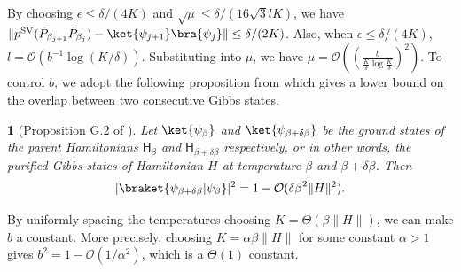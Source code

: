 \documentclass{article}
\theoremstyle{plain}
\newtheorem{lem}{\protect\lemmaname}
\theoremstyle{plain}
\theoremstyle{plain}
\theoremstyle{plain}
\theoremstyle{plain}
\theoremstyle{plain}
\theoremstyle{plain}
\providecommand{\lemmaname}{Lemma}
\newcommand{\norm}[1]{\lVert #1 \rVert}
\newcommand{\sfH}{\ensuremath{\mathsf{H}}}
\newcommand{\calO}{\ensuremath{\mathcal{O}}}
\begin{document}
By choosing $\epsilon \le \delta/(4K)$ and $\sqrt{\mu} \le \delta/(16\sqrt{3} l K)$, we have $\|p^{\text{SV}}(\tilde{P}_{\beta_{j+1}}\tilde{P}_{\beta_j}) - \ket{\psi_{j+1}} \bra{\psi_j}\| \le \delta/(2K)$. Also, when $\epsilon \le \delta/(4K)$, $l = \calO(b^{-1} \log(K/\delta))$. Substituting into $\mu$, we have $\mu = \calO\left( \left( \frac{b}{\frac{K}{\delta} \log \frac{K }{\delta}} \right)^2 \right)$.
To control $b$, we adopt the following proposition from \cite{chen2023quantumthermalstatepreparation} which gives a lower bound on the overlap between two consecutive Gibbs states.
\begin{lem}[Proposition G.2 of \cite{chen2023quantumthermalstatepreparation}]
    \label{lem:overlap}
    Let $\ket{\psi_{\beta}}$ and $\ket{\psi_{\beta+\delta\beta}}$ be the ground states of the parent Hamiltonians $\sfH_\beta$ and $\sfH_{\beta+\delta\beta}$ respectively, or in other words, the purified Gibbs states of Hamiltonian $H$ at temperature $\beta$ and $\beta + \delta\beta$. Then
    \begin{equation}
        |\braket{\psi_{\beta+\delta\beta} | \psi_{\beta}}|^2 = 1 - \calO( {\delta\beta}^2 \norm{H}^2  ).
    \end{equation}
\end{lem}
By uniformly spacing the temperatures choosing $K = \Theta(\beta \norm{H})$, we can make $b$ a constant. More precisely, choosing $K = \alpha \beta \norm{H}$ for some constant $\alpha > 1$ gives $b^2 = 1 - \calO(1/\alpha^2)$, which is a $\Theta(1)$ constant. 
\end{document}
